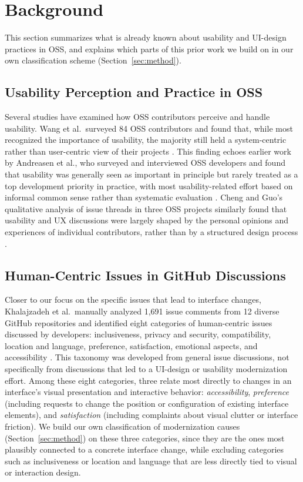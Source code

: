 \documentclass{article}
\begin{document}
\newpage
\section{Background}
\label{sec:background}

This section summarizes what is already known about usability and UI-design
practices in OSS, and explains which parts of this prior work we build on
in our own classification scheme (Section~\ref{sec:method}).

\subsection{Usability Perception and Practice in OSS}
Several studies have examined how OSS contributors perceive and handle
usability. Wang et al.\ surveyed 84 OSS contributors and found that, while
most recognized the importance of usability, the majority still held a
system-centric rather than user-centric view of their projects
\cite{wang2022how}. This finding echoes earlier work by Andreasen et al.,
who surveyed and interviewed OSS developers and found that usability was
generally seen as important in principle but rarely treated as a top
development priority in practice, with most usability-related effort based
on informal common sense rather than systematic evaluation
\cite{andreasen2006usability}. Cheng and Guo's qualitative analysis of
issue threads in three OSS projects similarly found that usability and UX
discussions were largely shaped by the personal opinions and experiences of
individual contributors, rather than by a structured design process
\cite{cheng2018how}.

\subsection{Human-Centric Issues in GitHub Discussions}
Closer to our focus on the specific issues that lead to interface changes,
Khalajzadeh et al.\ manually analyzed 1,691 issue comments from 12 diverse
GitHub repositories and identified eight categories of human-centric
issues discussed by developers: inclusiveness, privacy and security,
compatibility, location and language, preference, satisfaction, emotional
aspects, and accessibility \cite{khalajzadeh2022how}. This taxonomy was
developed from general issue discussions, not specifically from discussions
that led to a UI-design or usability modernization effort. Among these
eight categories, three relate most directly to changes in an interface's
visual presentation and interactive behavior: \emph{accessibility},
\emph{preference} (including requests to change the position or
configuration of existing interface elements), and \emph{satisfaction}
(including complaints about visual clutter or interface friction). We
build our own classification of modernization causes
(Section~\ref{sec:method}) on these three categories, since they are the
ones most plausibly connected to a concrete interface change, while
excluding categories such as inclusiveness or location and language that
are less directly tied to visual or interaction design.
\end{document}
